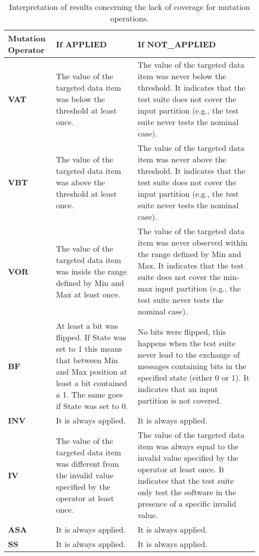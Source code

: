 \begin{table}[H]
\caption{Interpretation of results concerning the lack of coverage for mutation operations.}
\label{table:damat:interpretation}
\begin{tabular}{|p{2cm}|p{6cm}|p{6cm}|}
\hline
\textbf{Mutation Operator} & \textbf{If APPLIED} & \textbf{If NOT\_APPLIED} \\ \hline
\textbf{VAT} & The value of the targeted data item was below the threshold at least once. & The value of the targeted data item was never below the threshold. It indicates that the test suite does not cover the input partition (e.g., the test suite never tests the nominal case). \\ \hline
\textbf{VBT} & The value of the targeted data item was above the threshold at least once. & The value of the targeted data item was never above the threshold. It indicates that the test suite does not cover the input partition (e.g., the test suite never tests the nominal case). \\ \hline
\textbf{VOR} & The value of the targeted data item was inside the range defined by Min and Max at least once. & The value of the targeted data item was never observed within the range defined by Min and Max. It indicates that the test suite does not cover the min-max input partition (e.g., the test suite never tests the nominal case). \\ \hline
\textbf{BF} & At least a bit was flipped. If State was set to 1 this means that between Min and Max position at least a bit contained a 1. The same goes if State was set to 0. & No bits were flipped, this happens when the test suite never lead to the exchange of messages containing bits in the specified state (either $0$ or $1$). It indicates that an input partition is not covered.\\ \hline
\textbf{INV} & It is always applied.& It is always applied.\\ \hline
\textbf{IV} & The value of the targeted data item was different from the invalid value specified by the operator at least once.&
The value of the targeted data item was always equal to the invalid value specified by the operator at least once. It indicates that the test suite only test the software in the presence of a specific invalid value.\\ \hline
\textbf{ASA} & It is always applied.& It is always applied.\\ \hline
\textbf{SS} & It is always applied.& It is always applied.\\ \hline

\end{tabular}
\end{table}
